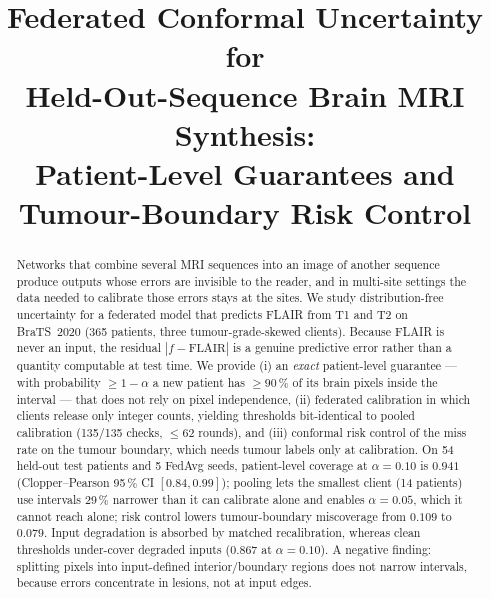 \documentclass[conference]{IEEEtran}
\begin{document}
\title{Federated Conformal Uncertainty for\\Held-Out-Sequence Brain MRI Synthesis:\\Patient-Level Guarantees and Tumour-Boundary Risk Control}

\author{
}

\maketitle

\begin{abstract}
Networks that combine several MRI sequences into an image of another sequence produce outputs whose errors are invisible to the reader, and in multi-site settings the data needed to calibrate those errors stays at the sites. We study distribution-free uncertainty for a federated model that predicts FLAIR from T1 and T2 on BraTS~2020 (365 patients, three tumour-grade-skewed clients). Because FLAIR is never an input, the residual $|f-\text{FLAIR}|$ is a genuine predictive error rather than a quantity computable at test time. We provide (i) an \emph{exact} patient-level guarantee --- with probability $\geq 1-\alpha$ a new patient has $\geq 90\,\%$ of its brain pixels inside the interval --- that does not rely on pixel independence, (ii) federated calibration in which clients release only integer counts, yielding thresholds bit-identical to pooled calibration (135/135 checks, $\leq 62$ rounds), and (iii) conformal risk control of the miss rate on the tumour boundary, which needs tumour labels only at calibration. On 54 held-out test patients and 5 FedAvg seeds, patient-level coverage at $\alpha{=}0.10$ is $0.941$ (Clopper--Pearson 95\,\% CI $[0.84, 0.99]$); pooling lets the smallest client (14 patients) use intervals 29\,\% narrower than it can calibrate alone and enables $\alpha{=}0.05$, which it cannot reach alone; risk control lowers tumour-boundary miscoverage from $0.109$ to $0.079$. Input degradation is absorbed by matched recalibration, whereas clean thresholds under-cover degraded inputs ($0.867$ at $\alpha{=}0.10$). A negative finding: splitting pixels into input-defined interior/boundary regions does not narrow intervals, because errors concentrate in lesions, not at input edges.
\end{abstract}
\end{document}
